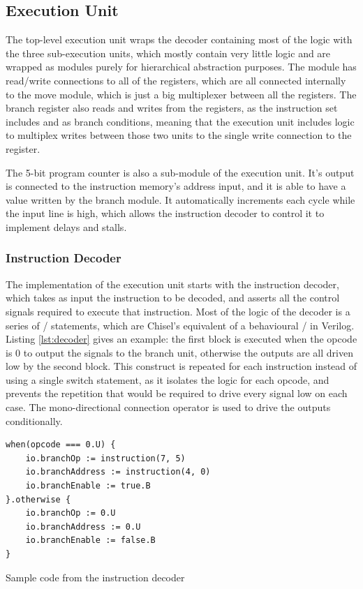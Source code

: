 \subsection{Execution Unit}

The top-level execution unit wraps the decoder containing most of the logic with the three sub-execution units, which mostly contain very little logic and are wrapped as modules purely for hierarchical abstraction purposes. The module has read/write connections to all of the registers, which are all connected internally to the move module, which is just a big multiplexer between all the registers. The branch register also reads and writes from the registers, as the instruction set includes  and  as branch conditions, meaning that the execution unit includes logic to multiplex writes between those two units to the single write connection to the register.

The 5-bit program counter is also a sub-module of the execution unit. It's output is connected to the instruction memory's address input, and it is able to have a value written by the branch module. It automatically increments each cycle while the  input line is high, which allows the instruction decoder to control it to implement delays and stalls.

\subsubsection{Instruction Decoder}

The implementation of the execution unit starts with the instruction decoder, which takes as input the instruction to be decoded, and asserts all the control signals required to execute that instruction. Most of the logic of the decoder is a series of / statements, which are Chisel's equivalent of a behavioural / in Verilog. Listing \ref{lst:decoder} gives an example: the first block is executed when the opcode is 0 to output the signals to the branch unit, otherwise the outputs are all driven low by the second block. This construct is repeated for each instruction instead of using a single switch statement, as it isolates the logic for each opcode, and prevents the repetition that would be required to drive every signal low on each case. The mono-directional connection operator \txt{:=} is used to drive the outputs conditionally.

\begin{listing}[h!]
    \vspace{0.5cm}
    \begin{verbatim}
when(opcode === 0.U) {
    io.branchOp := instruction(7, 5)
    io.branchAddress := instruction(4, 0)
    io.branchEnable := true.B
}.otherwise {
    io.branchOp := 0.U
    io.branchAddress := 0.U
    io.branchEnable := false.B
}
    \end{verbatim}
    \caption{Sample code from the instruction decoder}
    \label{lst:decoder}
\end{listing}


